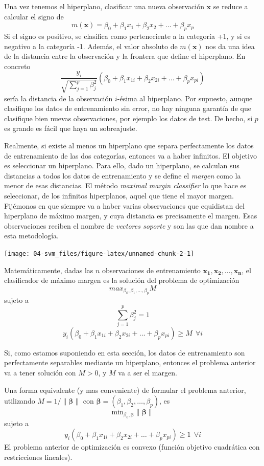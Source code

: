 \documentclass[
]{book}
\theoremstyle{break}
\theoremstyle{definition}
\theoremstyle{definition}
\theoremstyle{definition}
\theoremstyle{remark}
\begin{document}
Una vez tenemos el hiperplano, clasificar una nueva observación \(\mathbf{x}\) se reduce a calcular el signo de
\[m(\mathbf{x}) = \beta_0 + \beta_1 x_1 + \beta_2 x_2 + \ldots + \beta_p x_p\]
Si el signo es positivo, se clasifica como perteneciente a la categoría +1, y si es negativo a la categoría -1. Además, el valor absoluto de \(m(\mathbf{x})\) nos da una idea de la distancia entre la observación y la frontera que define el hiperplano. En concreto
\[\frac{y_i}{\sqrt {\sum_{j=1}^p \beta_j^2}}(\beta_0 + \beta_1 x_{1i} + \beta_2 x_{2i} + \ldots + \beta_p x_{pi})\]
sería la distancia de la observación \(i\)-ésima al hiperplano.
Por supuesto, aunque clasifique los datos de entrenamiento sin error, no hay ninguna garantía de que clasifique bien nuevas observaciones, por ejemplo los datos de test. De hecho, si \(p\) es grande es fácil que haya un sobreajuste.

Realmente, si existe al menos un hiperplano que separa perfectamente los datos de entrenamiento de las dos categorías, entonces va a haber infinitos. El objetivo es seleccionar un hiperplano. Para ello, dado un hiperplano, se calculan sus distancias a todos los datos de entrenamiento y se define el \emph{margen} como la menor de esas distancias. El método \emph{maximal margin classifier} lo que hace es seleccionar, de los infinitos hiperplanos, aquel que tiene el mayor margen. Fijémonos en que siempre va a haber varias observaciones que equidistan del hiperplano de máximo margen, y cuya distancia es precisamente el margen. Esas observaciones reciben el nombre de \emph{vectores soporte} y son las que dan nombre a esta metodología.

\begin{center}\texttt{[image: 04-svm\_files/figure-latex/unnamed-chunk-2-1]} \end{center}

Matemáticamente, dadas las \(n\) observaciones de entrenamiento \(\mathbf{x_1}, \mathbf{x_2}, \ldots, \mathbf{x_n}\), el clasificador de máximo margen es la solución del problema de optimización
\[max_{\beta_0, \beta_1,\ldots, \beta_p} M\]
sujeto a
\[\sum_{j=1}^p \beta_j^2 = 1\]
\[ y_i(\beta_0 + \beta_1 x_{1i} + \beta_2 x_{2i} + \ldots + \beta_p x_{pi}) \ge M \ \ \forall i\]

Si, como estamos suponiendo en esta sección, los datos de entrenamiento son perfectamente separables mediante un hiperplano, entonces el problema anterior va a tener solución con \(M>0\), y \(M\) va a ser el margen.

Una forma equivalente (y mas conveniente) de formular el problema anterior, utilizando \(M = 1/\lVert \boldsymbol{\beta} \rVert\) con \(\boldsymbol{\beta} = (\beta_1, \beta_2, \ldots, \beta_p)\), es
\[\mbox{min}_{\beta_0, \boldsymbol{\beta}} \lVert \boldsymbol{\beta} \rVert\]
sujeto a
\[ y_i(\beta_0 + \beta_1 x_{1i} + \beta_2 x_{2i} + \ldots + \beta_p x_{pi}) \ge 1 \ \ \forall i\]
El problema anterior de optimización es convexo (función objetivo cuadrática con restricciones lineales).
\end{document}
